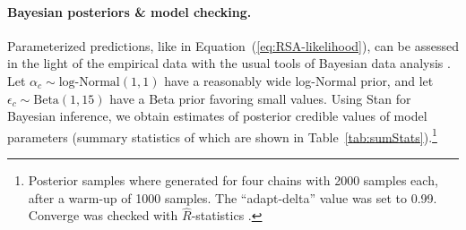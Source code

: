 \documentclass[fleqn]{article}
\begin{document}
\paragraph{Bayesian posteriors \& model checking.}
Parameterized predictions, like in Equation~(\ref{eq:RSA-likelihood}), can be assessed in the light of the empirical data with the usual tools of Bayesian data analysis \citep[e.g.][]{GelmanCarlin2014:Bayesian-Data-A,McElreath2016:Statistical-Ret,Lambert2018:A-Students-Guid}.
Let $\alpha_{c}\sim \text{log-Normal}(1,1)$ have a reasonably wide log-Normal prior, and let $\epsilon_{c} \sim \text{Beta}(1,15)$ have a Beta prior favoring small values.
Using Stan \citep{Team2023:The-Stan-Core-L} for Bayesian inference, we obtain estimates of posterior credible values of model parameters (summary statistics of which are shown in Table~\ref{tab:sumStats}).\footnote{
  Posterior samples where generated for four chains with 2000 samples each, after a warm-up of 1000 samples. The ``adapt-delta'' value was set to 0.99. Converge was checked with $\hat{R}$-statistics \citep{GelmanRubin1992:Inference-from-}.
}
\end{document}
